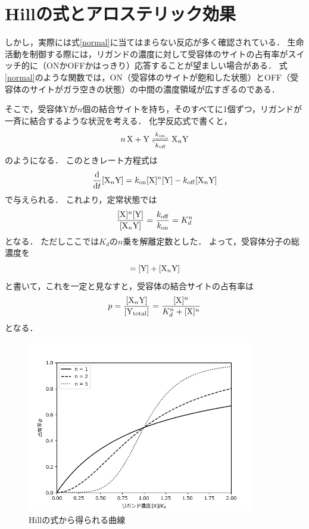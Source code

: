 \section{Hillの式とアロステリック効果}
しかし，実際には式\eqref{normal}に当てはまらない反応が多く確認されている．
生命活動を制御する際には，リガンドの濃度に対して受容体のサイトの占有率がスイッチ的に（ONかOFFかはっきり）応答することが望ましい場合がある\cite{PBoC}．
式\eqref{normal}のような関数では，ON（受容体のサイトが飽和した状態）とOFF（受容体のサイトがガラ空きの状態）の中間の濃度領域が広すぎるのである．

そこで，受容体Yが$n$個の結合サイトを持ち，そのすべてに1個ずつ，リガンドが一斉に結合するような状況を考える．
化学反応式で書くと，
\begin{equation}
  \ce{$n$X + Y <=>[$k$_{on}][$k$_{off}] X_{$n$}Y}
\end{equation}
のようになる．
このときレート方程式は
\begin{equation}
  \dv{t}[\ce{X_{n}Y}] = k_{\mathrm{on}}[\ce{X}]^n[\ce{Y}] - k_{\mathrm{off}}[\ce{X_{n}Y}]
\end{equation}
で与えられる．
これより，定常状態では
\begin{equation}
  \frac{[\ce{X}]^n[\ce{Y}]}{[\ce{X_{n}Y}]} = \frac{k_{\mathrm{off}}}{k_{\mathrm{on}}} = K_d^n
\end{equation}
となる．
ただしここでは$K_d$の$n$乗を解離定数とした．
よって，受容体分子の総濃度を
\begin{equation}
  [\ce{Y_{total}}] = [\ce{Y}] + [\ce{X_{n}Y}]
\end{equation}
と書いて，これを一定と見なすと，受容体の結合サイトの占有率は
\begin{equation}
  p = \frac{[\ce{X_{n}Y}]}{[\ce{Y_{total}}]} = \frac{[\ce{X}]^n}{K_d^n + [\ce{X}]^n} \label{hill}
\end{equation}
となる．

\begin{figure}[htbp]
  \centering
  \includegraphics[width=10cm]{hill.png}
  \caption{Hillの式から得られる曲線}
  \label{fig:hill}
\end{figure}

